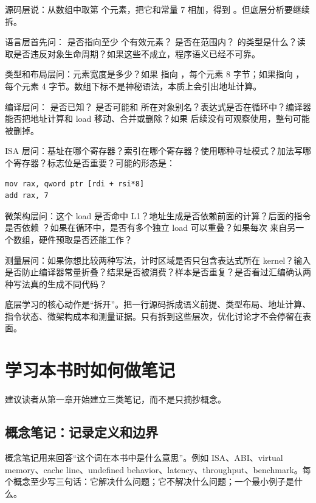源码层说：从数组中取第  个元素，把它和常量 7 相加，得到 。但底层分析要继续拆。

语言层首先问： 是否指向至少  个有效元素？ 是否在范围内？ 的类型是什么？读取是否违反对象生命周期？如果这些不成立，程序语义已经不可靠。

类型和布局层问：元素宽度是多少？如果  指向 ，每个元素 8 字节；如果指向 ，每个元素 4 字节。数组下标不是神秘语法，本质上会引出地址计算。

编译层问： 是否已知？ 是否可能和  所在对象别名？表达式是否在循环中？编译器能否把地址计算和 load 移动、合并或删除？如果  后续没有可观察使用，整句可能被删掉。

ISA 层问：基址在哪个寄存器？索引在哪个寄存器？使用哪种寻址模式？加法写哪个寄存器？标志位是否重要？可能的形态是：

\begin{lstlisting}
mov rax, qword ptr [rdi + rsi*8]
add rax, 7
\end{lstlisting}

微架构层问：这个 load 是否命中 L1？地址生成是否依赖前面的计算？后面的指令是否依赖 ？如果在循环中，是否有多个独立 load 可以重叠？如果每次  来自另一个数组，硬件预取是否还能工作？

测量层问：如果你想比较两种写法，计时区域是否只包含表达式所在 kernel？输入是否防止编译器常量折叠？结果是否被消费？样本是否重复？是否看过汇编确认两种写法真的生成不同代码？

\begin{mentalmodel}
底层学习的核心动作是“拆开”。把一行源码拆成语义前提、类型布局、地址计算、指令状态、微架构成本和测量证据。只有拆到这些层次，优化讨论才不会停留在表面。
\end{mentalmodel}

\section{学习本书时如何做笔记}

建议读者从第一章开始建立三类笔记，而不是只摘抄概念。

\subsection{概念笔记：记录定义和边界}

概念笔记用来回答“这个词在本书中是什么意思”。例如 ISA、ABI、virtual memory、cache line、undefined behavior、latency、throughput、benchmark。每个概念至少写三句话：它解决什么问题；它不解决什么问题；一个最小例子是什么。

